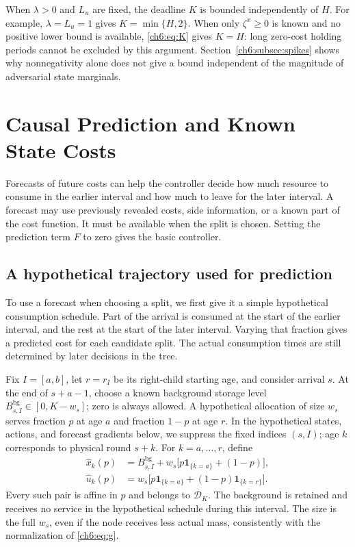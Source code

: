 \documentclass[11pt]{article}
\newcommand{\ind}[1]{\mathbf{1}_{\{#1\}}}
\theoremstyle{plain}
\theoremstyle{remark}
\numberwithin{equation}{section}
\begin{document}
When $\lambda>0$ and $L_u$ are fixed, the deadline $K$ is bounded
independently of $H$. For example, $\lambda=L_u=1$ gives
$K=\min\{H,2\}$. When only $\zeta^x\ge0$ is known and no positive lower
bound is available, \eqref{ch6:eq:K} gives $K=H$: long zero-cost holding
periods cannot be excluded by this argument.
Section~\ref{ch6:subsec:spikes} shows why nonnegativity alone does not give a
bound independent of the magnitude of adversarial state marginals.

\section{Causal Prediction and Known State Costs}
\label{ch6:sec:prediction}
Forecasts of future costs can help the controller decide how much resource
to consume in the earlier interval and how much to leave for the later
interval. A forecast may use previously revealed costs, side information,
or a known part of the cost function. It must be available when the split
is chosen. Setting the prediction term $F$ to zero gives the basic
controller.

\subsection{A hypothetical trajectory used for prediction}
To use a forecast when choosing a split, we first give it a simple
hypothetical consumption schedule. Part of the arrival is consumed at the
start of the earlier interval, and the rest at the start of the later
interval. Varying that fraction gives a predicted cost for each candidate
split. The actual consumption times are still determined by later decisions
in the tree.

Fix $I=[a,b]$, let $r=r_I$ be its right-child starting age, and consider
arrival $s$. At the end of $s+a-1$, choose a known background storage level
$B_{s,I}^{\mathrm{bg}}\in[0,K-w_s]$; zero is always allowed.
A hypothetical allocation of size $w_s$ serves fraction $p$ at age
$a$ and fraction $1-p$ at age $r$. In the hypothetical states, actions,
and forecast gradients below, we suppress the fixed indices $(s,I)$;
age $k$ corresponds to physical round $s+k$. For $k=a,\ldots,r$, define
\begin{align}
 \widehat x_k(p)&=B_{s,I}^{\mathrm{bg}}
 +w_s\bigl[p\ind{k=a}+(1-p)\bigr],\label{ch6:eq:virtual-x}\\
 \widehat u_k(p)&=w_s\bigl[p\ind{k=a}
 +(1-p)\ind{k=r}\bigr].\label{ch6:eq:virtual-u}
\end{align}
Every such pair is affine in $p$ and belongs to $\mathcal{D}_K$.
The background is retained and receives no service in the hypothetical schedule during this
interval. The size is the full $w_s$, even if the node receives less actual
mass, consistently with the normalization of \eqref{ch6:eq:g}.
\end{document}
